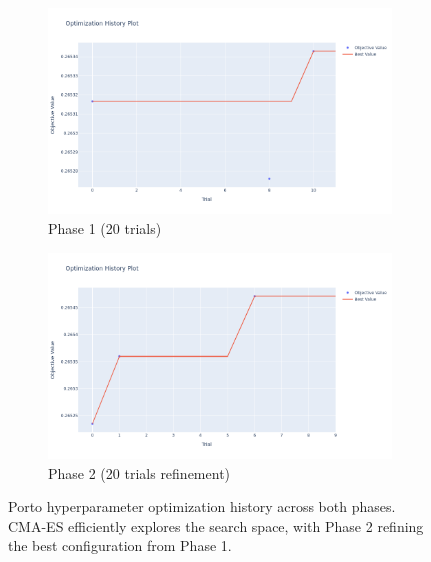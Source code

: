 \begin{figure}[t]
    \centering
    \begin{subfigure}{0.49\linewidth}
        \centering
        \includegraphics[width=\linewidth]{assets/plots/eval/porto/optuna/phase1/optimization_history.pdf}
        \caption{Phase 1 (20 trials)}
    \end{subfigure}
    \begin{subfigure}{0.49\linewidth}
        \centering
        \includegraphics[width=\linewidth]{assets/plots/eval/porto/optuna/phase2/optimization_history.pdf}
        \caption{Phase 2 (20 trials refinement)}
    \end{subfigure}
    \caption{Porto hyperparameter optimization history across both phases. CMA-ES efficiently explores the search space, with Phase 2 refining the best configuration from Phase 1.}
    \label{fig:porto-optuna-history}
\end{figure}

